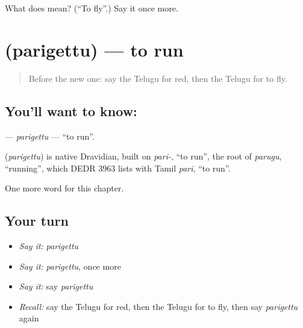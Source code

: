 \begin{tcolorbox}[breakable,colback=teal!4,colframe=teal!35!black,title={Before you move on}]
What does  mean? (\textquotedblleft{}To fly\textquotedblright{}.) Say it once more.
\end{tcolorbox}
\section[\texorpdfstring{\te{పరిగెత్తు} (parigettu)}{పరిగెత్తు (parigettu)}]{ (parigettu) — to run}

\label{lesson:TE-C143-parigettu}



\begin{quote}
Before the new one: say the Telugu for red, then the Telugu for to fly.
\end{quote}

\subsection*{You'll want to know: }
\textbf{} — \emph{parigettu} — \textquotedblleft{}to run\textquotedblright{}.

\begin{cousinweb}
\textbf{} (\emph{parigettu}) is native Dravidian, built on \emph{pari-}, \textquotedblleft{}to run\textquotedblright{}, the root of \emph{parugu}, \textquotedblleft{}running\textquotedblright{}, which DEDR 3963 lists with Tamil \emph{pari}, \textquotedblleft{}to run\textquotedblright{}.
\end{cousinweb}

\begin{grammarlens}[title={What you've built}]
One more word for this chapter.
\end{grammarlens}

\subsection*{Your turn}
\begin{itemize}
\raggedright
  \item \emph{Say it:} \emph{parigettu}
  \item \emph{Say it:} \emph{parigettu}, once more
  \item \emph{Say it:} say \emph{parigettu}
  \item \emph{Recall:} say the Telugu for red, then the Telugu for to fly, then say \emph{parigettu} again
\end{itemize}

